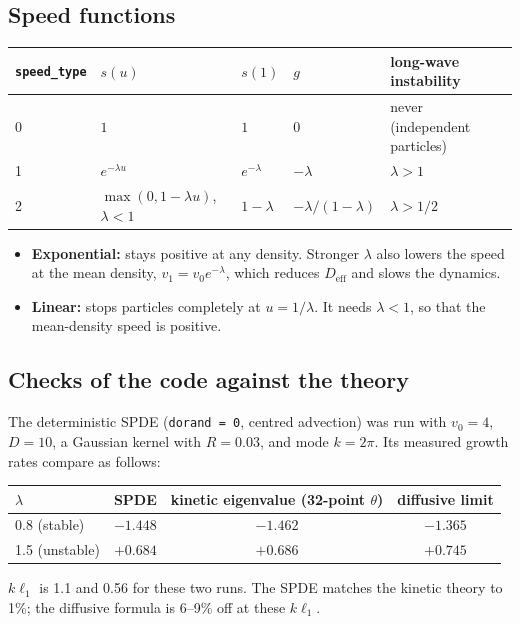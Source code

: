 \documentclass[11pt]{article}
\newcommand{\code}[1]{\texttt{#1}}
\begin{document}
\subsection{Speed functions}
\begin{center}
\begin{tabular}{@{}lllll@{}}
\toprule
\code{speed\_type} & $s(u)$ & $s(1)$ & $g$ & long-wave instability \\
\midrule
0 & $1$ & $1$ & $0$ & never (independent particles) \\
1 & $e^{-\lambda u}$ & $e^{-\lambda}$ & $-\lambda$ & $\lambda>1$ \\
2 & $\max(0,1-\lambda u)$, $\lambda<1$ & $1-\lambda$ & $-\lambda/(1-\lambda)$ & $\lambda>1/2$ \\
\bottomrule
\end{tabular}
\end{center}
\begin{itemize}
  \item \textbf{Exponential:} stays positive at any density. Stronger
        $\lambda$ also lowers the speed at the mean density,
        $v_1 = v_0e^{-\lambda}$, which reduces $D_{\mathrm{eff}}$ and slows
        the dynamics.
  \item \textbf{Linear:} stops particles completely at $u=1/\lambda$. It
        needs $\lambda<1$, so that the mean-density speed is positive.
\end{itemize}

\subsection{Checks of the code against the theory}
The deterministic SPDE (\code{dorand = 0}, centred advection) was run with
$v_0=4$, $D=10$, a Gaussian kernel with $R=0.03$, and mode $k=2\pi$. Its
measured growth rates compare as follows:
\begin{center}
\begin{tabular}{@{}lccc@{}}
\toprule
$\lambda$ & SPDE & kinetic eigenvalue (32-point $\theta$) & diffusive limit \\
\midrule
0.8 (stable) & $-1.448$ & $-1.462$ & $-1.365$ \\
1.5 (unstable) & $+0.684$ & $+0.686$ & $+0.745$ \\
\bottomrule
\end{tabular}
\end{center}
$k\ell_1$ is 1.1 and 0.56 for these two runs. The SPDE matches the kinetic
theory to 1\%; the diffusive formula is 6--9\% off at these $k\ell_1$.
\end{document}
